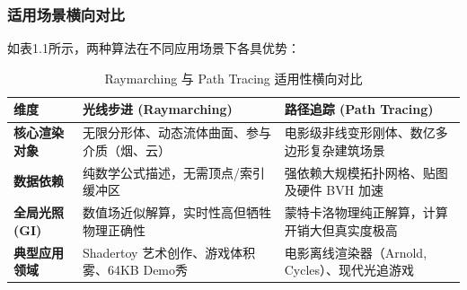 \documentclass[11pt, a4paper, oneside]{report}
\begin{document}
\subsubsection{适用场景横向对比}
如表1.1所示，两种算法在不同应用场景下各具优势：
\begin{table}[htbp]
\centering
\caption{Raymarching 与 Path Tracing 适用性横向对比}
\begin{tabular}{p{3cm}|p{6cm}|p{6cm}}
\hline
\textbf{维度} & \textbf{光线步进 (Raymarching)} & \textbf{路径追踪 (Path Tracing)} \\ \hline
\textbf{核心渲染对象} & 无限分形体、动态流体曲面、参与介质（烟、云） & 电影级非线变形刚体、数亿多边形复杂建筑场景 \\ \hline
\textbf{数据依赖} & 纯数学公式描述，无需顶点/索引缓冲区 & 强依赖大规模拓扑网格、贴图及硬件 BVH 加速 \\ \hline
\textbf{全局光照 (GI)} & 数值场近似解算，实时性高但牺牲物理正确性 & 蒙特卡洛物理纯正解算，计算开销大但真实度极高 \\ \hline
\textbf{典型应用领域} & Shadertoy 艺术创作、游戏体积雾、64KB Demo秀 & 电影离线渲染器（Arnold, Cycles）、现代光追游戏 \\ \hline
\end{tabular}
\end{table}
\end{document}
